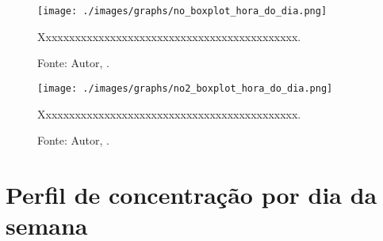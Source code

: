 





\begin{figure}[H]
    \centering
    \texttt{[image: ./images/graphs/no\_boxplot\_hora\_do\_dia.png]}
    \caption{Xxxxxxxxxxxxxxxxxxxxxxxxxxxxxxxxxxxxxxxxxxxx.}
    \label{fig:no_boxplot_hora_do_dia.png}
    \caption*{Fonte: Autor, \imprimirdata.}
\end{figure}




\begin{figure}[H]
    \centering
    \texttt{[image: ./images/graphs/no2\_boxplot\_hora\_do\_dia.png]}
    \caption{Xxxxxxxxxxxxxxxxxxxxxxxxxxxxxxxxxxxxxxxxxxxx.}
    \label{fig:no2_boxplot_hora_do_dia.png}
    \caption*{Fonte: Autor, \imprimirdata.}
\end{figure}





\section{Perfil de concentração por dia da semana}





